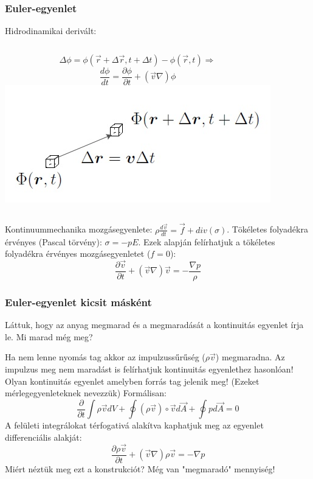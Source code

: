 \documentclass{beamer}
\begin{document}
\begin{frame}
\frametitle{Euler-egyenlet}
Hidrodinamikai derivált:
\begin{columns}
	\begin{equation*}
		\Delta  \phi = \phi (\vec{r}+\Delta\vec{r}, t+\Delta t)-\phi (\vec{r},t) \Rightarrow 
	\end{equation*}
	\begin{equation*}
		\frac{d \phi}{dt}=\frac{\partial \phi}{\partial t}+(\vec{v}\nabla)\phi
	\end{equation*}
	\includegraphics[width=1.00\textwidth]{pic/f2.jpg}
\end{columns}
Kontinuummechanika mozgásegyenlete: $\rho \frac{d \vec{v}}{dt}=\vec{f}+div(\sigma)$.
Tökéletes folyadékra érvényes (Pascal törvény): $\sigma=-pE$.
Ezek alapján felírhatjuk a tökéletes folyadékra érvényes mozgásegyenletet ($f=0$): 
\begin{equation*}
\frac{\partial \vec{v}}{\partial t}+(\vec{v}\nabla)\vec{v}=-\frac{\nabla p}{\rho}
\end{equation*}
\end{frame}

\begin{frame}
\frametitle{Euler-egyenlet kicsit másként}
Láttuk, hogy az anyag megmarad és a megmaradását a kontinuitás egyenlet írja le. Mi marad még meg? 

Ha nem lenne nyomás tag akkor az impulzussűrűség ($\rho \vec{v}$) megmaradna. Az impulzus meg nem maradást is felírhatjuk kontinuitás egyenlethez hasonlóan! Olyan kontinuitás egyenlet amelyben forrás tag jelenik meg! (Ezeket mérlegegyenleteknek nevezzük) 
Formálisan:
\begin{equation*}
\frac{\partial}{\partial t}\int \rho \vec{v} dV+\oint (\rho\vec{v})\circ\vec{v}d\vec{A}+\oint p d\vec{A}=0
\end{equation*}
A felületi integrálokat térfogativá alakítva kaphatjuk meg az egyenlet differenciális alakját:
\begin{equation*}
\frac{\partial\rho \vec{v}}{\partial t}+(\vec{v}\nabla)\rho\vec{v}=-\nabla p
\end{equation*}
Miért néztük meg ezt a konstrukciót? Még van "megmaradó" mennyiség!
\end{frame}
\end{document}
